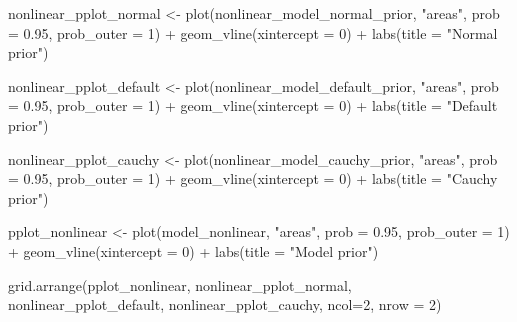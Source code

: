 \documentclass[
  letterpaper,
  DIV=11,
  numbers=noendperiod]{scrartcl}
\newenvironment{Shaded}{\begin{snugshade}}{\end{snugshade}}
\newcommand{\AttributeTok}[1]{\textcolor[rgb]{0.40,0.45,0.13}{#1}}
\newcommand{\DecValTok}[1]{\textcolor[rgb]{0.68,0.00,0.00}{#1}}
\newcommand{\FloatTok}[1]{\textcolor[rgb]{0.68,0.00,0.00}{#1}}
\newcommand{\FunctionTok}[1]{\textcolor[rgb]{0.28,0.35,0.67}{#1}}
\newcommand{\NormalTok}[1]{\textcolor[rgb]{0.00,0.23,0.31}{#1}}
\newcommand{\OtherTok}[1]{\textcolor[rgb]{0.00,0.23,0.31}{#1}}
\newcommand{\SpecialCharTok}[1]{\textcolor[rgb]{0.37,0.37,0.37}{#1}}
\newcommand{\StringTok}[1]{\textcolor[rgb]{0.13,0.47,0.30}{#1}}
\begin{document}
\begin{Shaded}
\begin{Highlighting}[]
\NormalTok{nonlinear\_pplot\_normal }\OtherTok{\textless{}{-}} \FunctionTok{plot}\NormalTok{(nonlinear\_model\_normal\_prior, }\StringTok{"areas"}\NormalTok{, }\AttributeTok{prob =} \FloatTok{0.95}\NormalTok{, }\AttributeTok{prob\_outer =} \DecValTok{1}\NormalTok{) }\SpecialCharTok{+}
  \FunctionTok{geom\_vline}\NormalTok{(}\AttributeTok{xintercept =} \DecValTok{0}\NormalTok{) }\SpecialCharTok{+} \FunctionTok{labs}\NormalTok{(}\AttributeTok{title =} \StringTok{"Normal prior"}\NormalTok{)}

\NormalTok{nonlinear\_pplot\_default }\OtherTok{\textless{}{-}} \FunctionTok{plot}\NormalTok{(nonlinear\_model\_default\_prior, }\StringTok{"areas"}\NormalTok{, }\AttributeTok{prob =} \FloatTok{0.95}\NormalTok{, }\AttributeTok{prob\_outer =} \DecValTok{1}\NormalTok{) }\SpecialCharTok{+}
  \FunctionTok{geom\_vline}\NormalTok{(}\AttributeTok{xintercept =} \DecValTok{0}\NormalTok{) }\SpecialCharTok{+} \FunctionTok{labs}\NormalTok{(}\AttributeTok{title =} \StringTok{"Default prior"}\NormalTok{)}

\NormalTok{nonlinear\_pplot\_cauchy }\OtherTok{\textless{}{-}} \FunctionTok{plot}\NormalTok{(nonlinear\_model\_cauchy\_prior, }\StringTok{"areas"}\NormalTok{, }\AttributeTok{prob =} \FloatTok{0.95}\NormalTok{, }\AttributeTok{prob\_outer =} \DecValTok{1}\NormalTok{) }\SpecialCharTok{+}
  \FunctionTok{geom\_vline}\NormalTok{(}\AttributeTok{xintercept =} \DecValTok{0}\NormalTok{) }\SpecialCharTok{+} \FunctionTok{labs}\NormalTok{(}\AttributeTok{title =} \StringTok{"Cauchy prior"}\NormalTok{)}

\NormalTok{pplot\_nonlinear }\OtherTok{\textless{}{-}} \FunctionTok{plot}\NormalTok{(model\_nonlinear, }\StringTok{"areas"}\NormalTok{, }\AttributeTok{prob =} \FloatTok{0.95}\NormalTok{, }\AttributeTok{prob\_outer =} \DecValTok{1}\NormalTok{) }\SpecialCharTok{+}
\FunctionTok{geom\_vline}\NormalTok{(}\AttributeTok{xintercept =} \DecValTok{0}\NormalTok{) }\SpecialCharTok{+} \FunctionTok{labs}\NormalTok{(}\AttributeTok{title =} \StringTok{"Model prior"}\NormalTok{)}

\FunctionTok{grid.arrange}\NormalTok{(pplot\_nonlinear, nonlinear\_pplot\_normal, nonlinear\_pplot\_default, nonlinear\_pplot\_cauchy, }\AttributeTok{ncol=}\DecValTok{2}\NormalTok{, }\AttributeTok{nrow =} \DecValTok{2}\NormalTok{) }
\end{Highlighting}
\end{Shaded}
\end{document}
